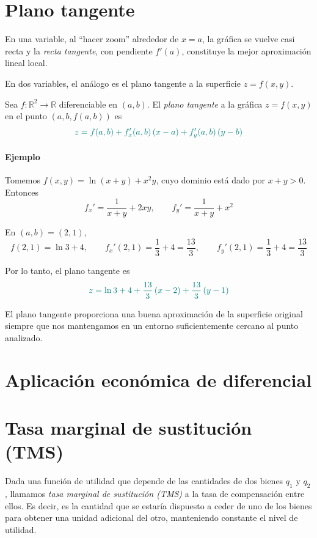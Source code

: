 \documentclass{article}
\begin{document}
\section*{Plano tangente}

En una variable, al “hacer zoom” alrededor de \(x=a\), la gráfica se vuelve casi recta y la \emph{recta tangente}, con pendiente \(f'(a)\), constituye la mejor aproximación lineal local.

En dos variables, el análogo es el plano tangente a la superficie \(z=f(x,y)\).

Sea \(f:\mathbb{R}^2\to\mathbb{R}\) diferenciable en \((a,b)\). El \emph{plano tangente} a la gráfica \(z=f(x,y)\) en el punto \((a,b,f(a,b))\) es
\[
\color{teal}
z
=
f(a,b)
+
f_x'(a,b)\,(x-a)
+
f_y'(a,b)\,(y-b)
\]


\paragraph*{Ejemplo}

Tomemos \(f(x,y)=\ln(x+y)+x^{2}y\), cuyo dominio está dado por \(x+y>0\). Entonces
\[
f_x'
=
\frac{1}{x+y}+2xy,
\qquad
f_y'
=
\frac{1}{x+y}+x^2
\]

En \((a,b)=(2,1)\),
\[
f(2,1)=\ln 3+4,
\qquad
f_x'(2,1)=\frac{1}{3}+4=\frac{13}{3},
\qquad
f_y'(2,1)=\frac{1}{3}+4=\frac{13}{3}
\]

Por lo tanto, el plano tangente es
\[
\color{teal}
z
=
\ln 3 + 4
+
\frac{13}{3}\,(x-2)
+
\frac{13}{3}\,(y-1)
\]

El plano tangente proporciona una buena aproximación de la superficie original siempre que nos mantengamos en un entorno suficientemente cercano al punto analizado.



\newpage
\section{Aplicación económica de diferencial}

\section*{Tasa marginal de sustitución (TMS)}

Dada una función de utilidad que depende de las cantidades de dos bienes \( q_1 \) y \( q_2 \), llamamos \textit{tasa marginal de sustitución (TMS)} a la tasa de compensación entre ellos. Es decir, es la cantidad que se estaría dispuesto a ceder de uno de los bienes para obtener una unidad adicional del otro, manteniendo constante el nivel de utilidad.
\end{document}
